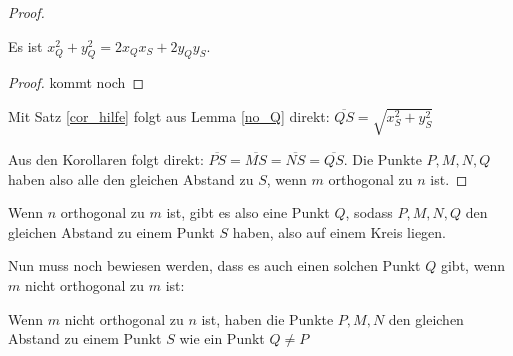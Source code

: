 \begin{proof}
\begin{lem}
        Es ist $x_Q^2+y_Q^2=2x_Qx_S+2y_Qy_S$.
    \end{lem}
    \begin{proof}
        kommt noch
    \end{proof}
    \begin{cor}\label{noc_Q}
        Mit Satz \ref{cor_hilfe}  folgt aus Lemma \ref{no_Q} direkt: $\overline{QS}=\sqrt{x_S^2+y_S^2}$
    \end{cor}
    Aus den Korollaren folgt direkt: $\overline{PS}=\overline{MS}=\overline{NS}=\overline{QS}$. Die Punkte 
    $P, M, N, Q$ haben also alle den gleichen Abstand zu $S$, wenn $m$ orthogonal zu $n$ ist.
    \renewcommand{\qedsymbol}{$\blacksquare$}
\end{proof}

Wenn $n$ orthogonal zu $m$ ist, gibt es also eine Punkt $Q$, sodass $P, M, N, Q$ den gleichen Abstand zu einem Punkt 
$S$ haben, also auf einem Kreis liegen.

Nun muss noch bewiesen werden, dass es auch einen solchen Punkt $Q$ gibt, wenn $m$ nicht orthogonal zu $m$ ist:

\begin{thm}
    Wenn $m$ nicht orthogonal zu $n$ ist, haben die Punkte $P, M, N$ den gleichen Abstand zu einem Punkt $S$ wie 
    ein Punkt $Q\neq P$
\end{thm}